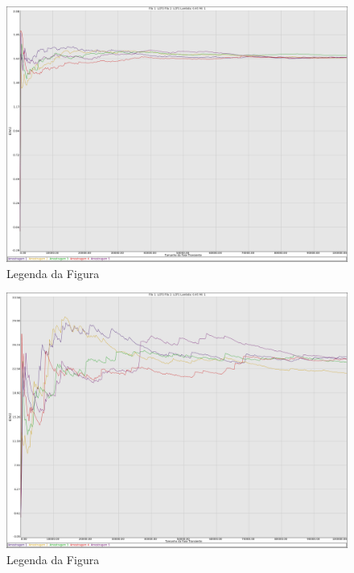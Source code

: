 \documentclass[a4paper,10pt]{article}
\begin{document}
\begin{figure}
	\caption{Legenda da Figura}
	\label{figTransienteLCFSfila1W}
	\includegraphics[scale = 0.2]{./graficos_transiente_1/LCFS/07.png}
\end{figure}

\begin{figure}
	\caption{Legenda da Figura}
	\label{figTransienteLCFSfila2W}
	\includegraphics[scale = 0.2]{./graficos_transiente_1/LCFS/08.png}
\end{figure}
\end{document}
